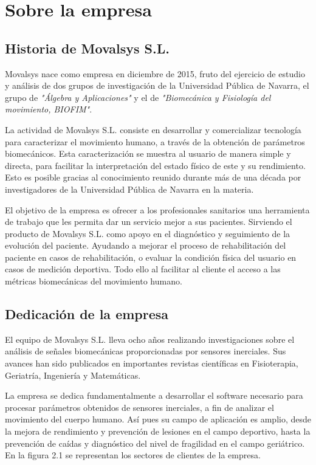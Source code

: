 \chapter{Sobre la empresa}

	\section{Historia de Movalsys S.L.}
	
		Movalsys nace como empresa en diciembre de 2015, fruto del ejercicio de estudio y análisis de dos grupos de investigación de la Universidad Pública de Navarra, el grupo de \textit{"Álgebra y Aplicaciones"} y el de \textit{"Biomecánica y Fisiología del movimiento, BIOFIM"}. 
		
		La actividad de Movalsys S.L. consiste en desarrollar y comercializar tecnología para caracterizar el movimiento humano, a través de la obtención de parámetros biomecánicos. Esta caracterización se muestra al usuario de manera simple y directa, para facilitar la interpretación del estado físico de este y su rendimiento. Esto es posible gracias al conocimiento reunido durante más de una década por investigadores de la Universidad Pública de Navarra en la materia. 
		
		El objetivo de la empresa es ofrecer a los profesionales sanitarios una herramienta de trabajo que les permita dar un servicio mejor a sus pacientes. Sirviendo el producto de Movalsys S.L. como apoyo en el diagnóstico y seguimiento de la evolución del paciente. Ayudando a mejorar el proceso de rehabilitación del paciente en casos de rehabilitación, o evaluar la condición física del usuario en casos de medición deportiva. Todo ello al facilitar al cliente el acceso a las métricas biomecánicas del movimiento humano.
		

	\section{Dedicación de la empresa}
	
		El equipo de Movalsys S.L. lleva ocho años realizando investigaciones sobre el análisis de señales biomecánicas proporcionadas por sensores inerciales. Sus avances han sido publicados en importantes revistas científicas en Fisioterapia, Geriatría, Ingeniería y Matemáticas.
		
		La empresa se dedica fundamentalmente a desarrollar el software necesario para procesar parámetros obtenidos de sensores inerciales, a fin de analizar el movimiento del cuerpo humano. Así pues su campo de aplicación es amplio, desde la mejora de rendimiento y prevención de lesiones en el campo deportivo, hasta la prevención de caídas y diagnóstico del nivel de fragilidad en el campo geriátrico. En la figura 2.1 se representan los sectores de clientes de la empresa.
		
